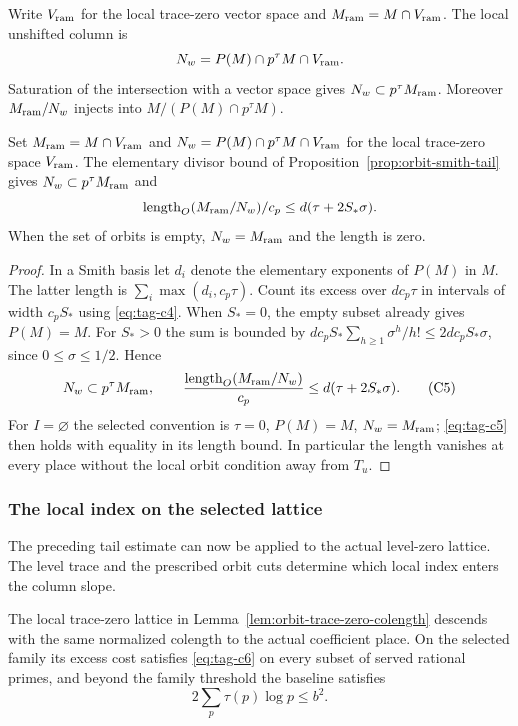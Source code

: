 Write \(V_{\rm ram}\) for the local trace-zero vector space and
\(M_{\rm ram}=M\cap V_{\rm ram}\). The local unshifted column is
\[
 N_w=P(M)\cap p^\tau M\cap V_{\rm ram}.
\]
Saturation of the intersection with a vector space gives
\(N_w\subset p^\tau M_{\rm ram}\). Moreover \(M_{\rm ram}/N_w\)
injects into \(M/(P(M)\cap p^\tau M)\).

\begin{lemma}\label{lem:orbit-trace-zero-colength}
Set \(M_{\rm ram}=M\cap V_{\rm ram}\) and
\(N_w=P(M)\cap p^\tau M\cap V_{\rm ram}\) for the local trace-zero
space \(V_{\rm ram}\). The elementary divisor bound of
Proposition~\ref{prop:orbit-smith-tail} gives
\(N_w\subset p^\tau M_{\rm ram}\) and
\[
 \operatorname{length}_O(M_{\rm ram}/N_w)/c_p
   \le d(\tau+2 S_*\sigma).
\]
When the set of orbits is empty, \(N_w=M_{\rm ram}\) and
the length is zero.
\end{lemma}

\begin{proof}
In a Smith basis let
\(d_i\) denote the elementary exponents of \(P(M)\) in \(M\).
The latter length is \(\sum_i\max(d_i,c_p\tau)\).
Count its excess over \(dc_p\tau\) in intervals of width \(c_p S_*\)
using \eqref{eq:tag-c4}. When \(S_*=0\), the empty subset already gives \(P(M)=M\).
For \(S_*>0\) the sum is bounded by
\(dc_pS_*\sum_{h\ge1}\sigma^h/h!\le 2dc_p S_*\sigma\), since
\(0\le\sigma\le1/2\). Hence
\[
  N_w\subset p^\tau M_{\rm ram},\qquad
  \frac{\operatorname{length}_O(M_{\rm ram}/N_w)}{c_p}
        \le d(\tau+2S_*\sigma).                                  \tag{C5}\label{eq:tag-c5}
\]
For \(I=\varnothing\) the selected convention is \(\tau=0\),
\(P(M)=M\), \(N_w=M_{\rm ram}\); \eqref{eq:tag-c5} then holds with equality
in its length bound. In particular the length vanishes at every
place without the local orbit condition away from \(T_u\).
\end{proof}

\subsubsection{The local index on the selected lattice}

The preceding tail estimate can now be applied to the actual level-zero lattice. The level trace and the prescribed orbit cuts determine which local index enters the column slope.

\begin{proposition}\label{prop:orbit-local-descent}
The local trace-zero lattice in Lemma~\ref{lem:orbit-trace-zero-colength}
descends with the same normalized colength to the actual
coefficient place. On the selected family its excess cost
satisfies \textup{\eqref{eq:tag-c6}} on every subset of served rational primes,
and beyond the family threshold the baseline satisfies
\[
 2\sum_p\tau(p)\log p\le b^2.
\]

\end{proposition}

